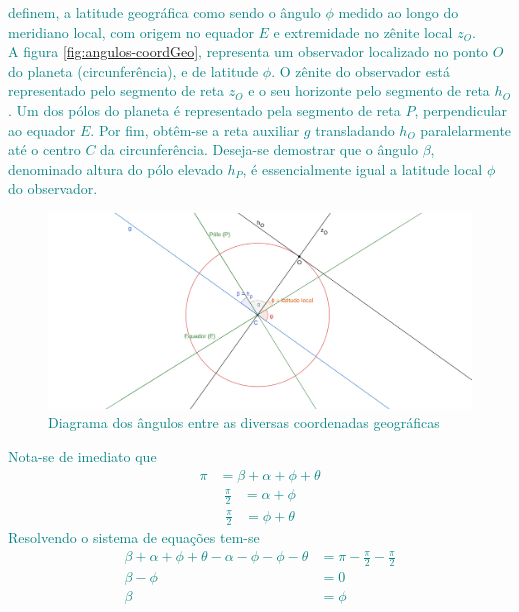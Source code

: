 \begin{sol}
	\textcolor{teal} {
		\cite{ASTRN&ASTRFIS:2004} definem, a latitude geográfica como sendo o ângulo $\phi$ medido ao longo do meridiano local, com origem no equador $E$ e extremidade no zênite local $z_{O}$.\\				
		A figura \eqref{fig:angulos-coordGeo}, representa um observador localizado no ponto $O$ do planeta (circunferência), e de latitude $\phi$. O zênite do observador está representado pelo segmento de reta $z_{O}$ e o seu horizonte pelo segmento de reta $h_O$. Um dos pólos do planeta é representado pela segmento de reta $P$, perpendicular ao equador $E$. Por fim, obtêm-se a reta auxiliar $g$ transladando $h_O$ paralelarmente até o centro $C$ da circunferência. Deseja-se demostrar que o ângulo $\beta$, denominado altura do pólo elevado $h_P$, é essencialmente igual a latitude local $\phi$ do observador.	
		\begin{figure}[!ht]
			\centering
			\includegraphics[width=\textwidth]{fig/geogebra-export.png}
			\caption{Diagrama dos ângulos entre as diversas coordenadas geográficas}
			\label{fig:angulos-coordGeo}
		\end{figure}
	}
	
	\textcolor{teal} {
		Nota-se de imediato que
		\begin{align}
			\pi&=\beta+\alpha+\phi+\theta
		\end{align}
		\begin{align}
			\frac{\pi}{2}&=\alpha+\phi
		\end{align}
		\begin{align}
			\frac{\pi}{2}&=\phi+\theta
		\end{align}
		Resolvendo o sistema de equações tem-se
		\begin{align}
			\beta+\alpha+\phi+\theta-\alpha-\phi-\phi-\theta&=\pi-\frac{\pi}{2}-\frac{\pi}{2} \nonumber \\
			\beta-\phi&=0 \nonumber \\
			\beta&=\phi
		\end{align}
	}
	
\end{sol}
